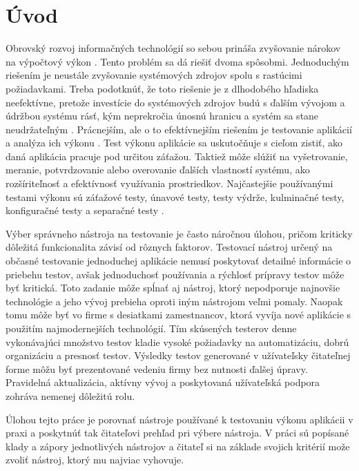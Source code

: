 \documentclass[12pt,oneside,final]{fithesis-utf8}
\begin{document}
\chapter{Úvod}
Obrovský rozvoj informačných technológií so sebou prináša zvyšovanie nárokov na
výpočtový výkon \cite{ComputingPower}. Tento problém sa dá riešiť dvoma spôsobmi. Jednoduchým riešením 
je neustále zvyšovanie systémových zdrojov spolu s rastúcimi požiadavkami. Treba 
podotknúť, že toto riešenie je z dlhodobého hľadiska neefektívne, pretože investície do 
systémových zdrojov budú s ďalším vývojom a údržbou systému rásť, kým neprekročia 
únosnú hranicu a systém sa stane neudržateľným \cite{Sochor}. Prácnejším, ale o to efektívnejším 
riešením je testovanie aplikácií a analýza ich výkonu \cite{Art}. Test výkonu aplikácie sa 
uskutočňuje s cieľom zistiť, ako daná aplikácia pracuje pod určitou záťažou. Taktiež môže 
slúžiť na vyšetrovanie, meranie, potvrdzovanie alebo overovanie ďalších vlastností systému, 
ako rozšíriteľnosť a efektívnosť využívania prostriedkov. Najčastejšie používanými testami 
výkonu sú záťažové testy, únavové testy, testy výdrže, kulminačné testy, konfiguračné testy a separačné testy \cite{Art}.
\newline
\par
Výber správneho nástroja na testovanie je často náročnou úlohou, pričom kriticky dôležitá funkcionalita závisí od rôznych faktorov. Testovací nástroj určený na občasné testovanie jednoduchej aplikácie nemusí  poskytovať detailné informácie o priebehu testov, avšak jednoduchosť používania a rýchlosť prípravy testov môže byť kritická. Toto zadanie môže spĺnať aj nástroj, ktorý nepodporuje najnovšie technológie a jeho vývoj prebieha oproti iným nástrojom veľmi pomaly. Naopak tomu môže byť vo firme s desiatkami zamestnancov, ktorá vyvíja nové aplikácie s použitím najmodernejších technológií. Tím skúsených testerov denne vykonávajúci množstvo testov kladie vysoké požiadavky na automatizáciu, dobrú organizáciu a presnosť testov. Výsledky testov generované v užívateľsky čitateľnej forme môžu byť prezentované vedeniu firmy bez nutnosti ďalšej úpravy. Pravidelná aktualizácia, aktívny vývoj a poskytovaná užívateľská podpora zohráva nemenej dôležitú rolu.
\newline
\par
Úlohou tejto práce je porovnať nástroje používané k testovaniu výkonu aplikácii v praxi a poskytnúť tak čitateľovi prehľad pri výbere nástroja. V práci sú popísané klady a zápory jednotlivých nástrojov a čitateľ si na základe svojich kritérií može zvoliť nástroj, ktorý mu najviac vyhovuje.
\end{document}
